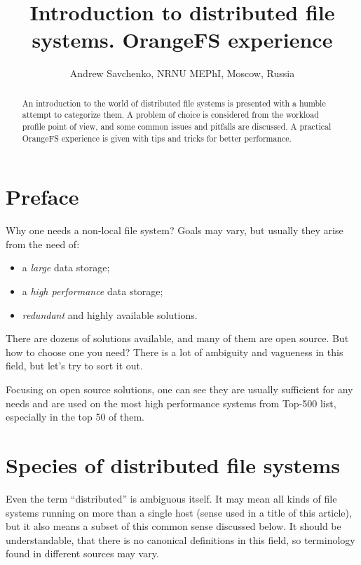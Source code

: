 \documentclass[10pt, a5paper]{article}
\begin{document}
\title{Introduction to distributed file systems. OrangeFS experience}
\author{Andrew Savchenko, NRNU MEPhI, Moscow, Russia}
\maketitle
\begin{abstract}
An introduction to the world of distributed file systems is presented with a humble attempt to categorize them. A problem of choice is
considered from the workload profile point of view, and some common issues and pitfalls are discussed. A practical OrangeFS experience is
given with tips and tricks for better performance.
\end{abstract}
\section*{Preface}

Why one needs a non-local file system? Goals may vary, but usually they arise from the need of:

\begin{itemize}
  \item a \emph{large} data storage;
  \item a \emph{high performance} data storage;
  \item \emph{redundant} and highly available solutions.
\end{itemize}

There are dozens of solutions available\cite{bib1}, and many of them are open source. But how to choose one you need? There is a lot of ambiguity and vagueness in this field, but let's try to sort it out.

Focusing on open source solutions, one can see they are usually sufficient for any needs and are used on the most high performance systems from Top-500\cite{bib2} list, especially in the top 50 of them.

\section*{Species of distributed file systems}

Even the term ``distributed'' is ambiguous itself. It may mean all kinds of file systems running on more than a single host (sense used in a title of this article), but it also means a subset of this common sense discussed below. It should be understandable, that there is no canonical definitions in this field, so terminology found in different sources may vary.
\end{document}
